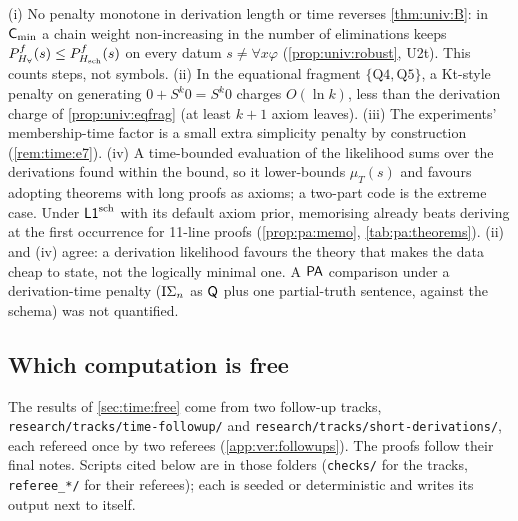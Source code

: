 \begin{remark}\label{rem:time:links}
(i) No penalty monotone in derivation length or time reverses \cref{thm:univ:B}: in $\mathsf{C}_{\min}$ a chain weight non-increasing in the number of eliminations keeps $P^f_{H_{\forall}}(s)\le P^f_{H_{\mathrm{sch}}}(s)$ on every datum $s\ne\forall x\varphi$ (\cref{prop:univ:robust}, U2t). This counts steps, not symbols.
(ii) In the equational fragment $\{\text{Q4},\text{Q5}\}$, a Kt-style penalty on generating $0+S^k0=S^k0$ charges $O(\ln k)$, less than the derivation charge of \cref{prop:univ:eqfrag} (at least $k+1$ axiom leaves).
(iii) The experiments' membership-time factor is a small extra simplicity penalty by construction (\cref{rem:time:e7}).
(iv) A time-bounded evaluation of the likelihood sums over the derivations found within the bound, so it lower-bounds $\mu_T(s)$ and favours adopting theorems with long proofs as axioms; a two-part code is the extreme case. Under $\mathord{\mathsf{L1}}^{\mathrm{sch}}$ with its default axiom prior, memorising already beats deriving at the first occurrence for 11-line proofs (\cref{prop:pa:memo}, \cref{tab:pa:theorems}).
(ii) and (iv) agree: a derivation likelihood favours the theory that makes the data cheap to state, not the logically minimal one. A $\mathsf{PA}$ comparison under a derivation-time penalty ($\mathrm{I}\Sigma_{n}$ as $\mathsf{Q}$ plus one partial-truth sentence, against the schema) was not quantified.
\end{remark}

\subsection{Which computation is free}\label{app:time:free}

The results of \cref{sec:time:free} come from two follow-up tracks, \texttt{research/tracks/time-followup/} and \texttt{research/tracks/short-derivations/}, each refereed once by two referees (\cref{app:ver:followups}). The proofs follow their final notes. Scripts cited below are in those folders (\texttt{checks/} for the tracks, \texttt{referee\_*/} for their referees); each is seeded or deterministic and writes its output next to itself.

